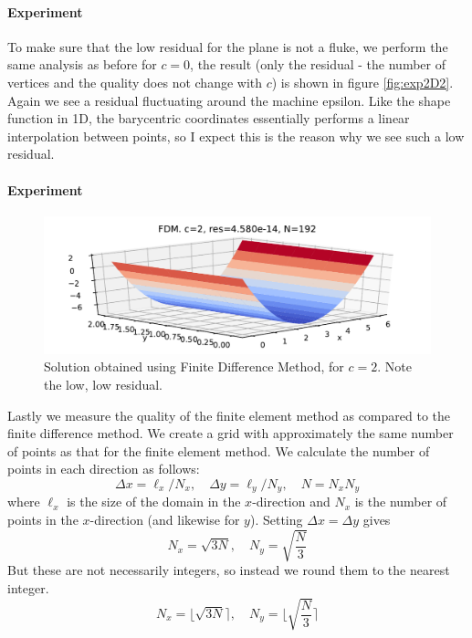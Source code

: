 \documentclass[sigconf]{acmart}
\begin{document}
\paragraph{Experiment} To make sure that the low residual for the plane is not a fluke, we perform the same analysis as before for $ c=0 $, the result (only the residual - the number of vertices and the quality does not change with $ c $) is shown in figure \ref{fig:exp2D2}. Again we see a residual fluctuating around the machine epsilon. Like the shape function in 1D, the barycentric coordinates essentially performs a linear interpolation between points, so I expect this is the reason why we see such a low residual.

\paragraph{Experiment}
\begin{figure}[b]
	\includegraphics[width=\linewidth]{simpleFDM.pdf}
	\caption{Solution obtained using Finite Difference Method, for $ c=2 $. Note the low, low residual.}
	\label{fig:simpleFDM}
\end{figure}
Lastly we measure the quality of the finite element method as compared to the finite difference method. We create a grid with approximately the same number of points as that for the finite element method. We calculate the number of points in each direction as follows:
\begin{equation}\label{key}
	\Delta x = \ell_x/ N_x, \quad \Delta y = \ell_y/N_y, \quad N=N_x N_y
\end{equation}
where $ \ell_x $ is the size of the domain in the $ x $-direction and $ N_x $ is the number of points in the $ x $-direction (and likewise for $ y $). Setting $ \Delta x = \Delta y $ gives
\begin{equation}\label{key}
	N_x = \sqrt{3N}, \quad N_y = \sqrt{\frac{N}{3}}
\end{equation}
But these are not necessarily integers, so instead we round them to the nearest integer.
\begin{equation}\label{key}
	N_x = \Big\lfloor\sqrt{3N}\Big\rceil, \quad N_y = \Bigg\lfloor\sqrt{\frac{N}{3}}\Bigg\rceil
\end{equation}
\end{document}
